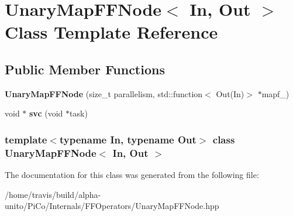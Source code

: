 \hypertarget{class_unary_map_f_f_node}{\section{\-Unary\-Map\-F\-F\-Node$<$ \-In, \-Out $>$ \-Class \-Template \-Reference}
\label{class_unary_map_f_f_node}
}
\subsection*{\-Public \-Member \-Functions}
\begin{DoxyCompactItemize}
\item 
\hypertarget{class_unary_map_f_f_node_a858a4d82f74827f951bb3b8c53aeeb3d}{{\bfseries \-Unary\-Map\-F\-F\-Node} (size\-\_\-t parallelism, std\-::function$<$ \-Out(\-In)$>$ $\ast$mapf\-\_\-)}\label{class_unary_map_f_f_node_a858a4d82f74827f951bb3b8c53aeeb3d}

\item 
\hypertarget{class_unary_map_f_f_node_a5c994712fefbef1df5bc44502a8febd8}{void $\ast$ {\bfseries svc} (void $\ast$task)}\label{class_unary_map_f_f_node_a5c994712fefbef1df5bc44502a8febd8}

\end{DoxyCompactItemize}
\subsubsection*{template$<$typename \-In, typename \-Out$>$ class Unary\-Map\-F\-F\-Node$<$ In, Out $>$}



\-The documentation for this class was generated from the following file\-:\begin{DoxyCompactItemize}
\item 
/home/travis/build/alpha-\/unito/\-Pi\-Co/\-Internals/\-F\-F\-Operators/\-Unary\-Map\-F\-F\-Node.\-hpp\end{DoxyCompactItemize}
